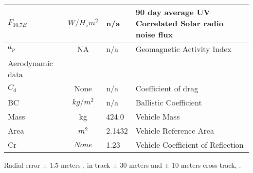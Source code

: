 \begin{table}[htb]
\begin{center}
\begin{tabular}{|l|c|l|l|}
$F_{10.7B}$       & $W/{H_z}{m^2}$    &  n/a              &  90 day average UV Correlated Solar radio noise flux  \\ \hline
$a_p$             &  NA               &  n/a             &  Geomagnetic Activity Index                \\ \hline \hline
Aerodynamic data  &           &                       &      \\ \hline \hline
$C_d$             &None       &     n/a                  & Coefficient of drag \\ \hline
BC                &$kg/m^2$   &     n/a                 & Ballistic Coefficient \\ \hline
Mass              &kg         &     424.0                  & Vehicle Mass           \\ \hline
Area              &$m^2$      &    2.1432                  & Vehicle Reference Area  \\ \hline
Cr                &$None$      &    1.23                  & Vehicle Coefficient of Reflection   \\ \hline
\end{tabular}
\end{center}
\end{table}
Radial error  $ \pm $ 1.5 meters , in-track  $ \pm $ 30 meters and  $ \pm $ 10 meters cross-track, \cite{AK} .
